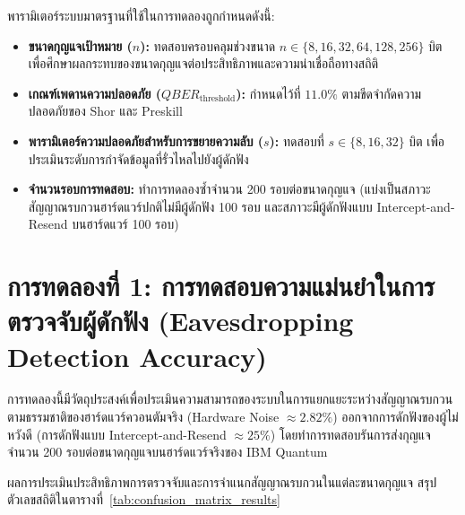 พารามิเตอร์ระบบมาตรฐานที่ใช้ในการทดลองถูกกำหนดดังนี้:
\begin{itemize}
    \item \textbf{ขนาดกุญแจเป้าหมาย ($n$):} ทดสอบครอบคลุมช่วงขนาด $n \in \{8, 16, 32, 64, 128, 256\}$ บิต เพื่อศึกษาผลกระทบของขนาดกุญแจต่อประสิทธิภาพและความน่าเชื่อถือทางสถิติ
    \item \textbf{เกณฑ์เพดานความปลอดภัย ($QBER_{\text{threshold}}$):} กำหนดไว้ที่ $11.0\%$ ตามขีดจำกัดความปลอดภัยของ Shor และ Preskill~\cite{shor_preskill_2000}
    \item \textbf{พารามิเตอร์ความปลอดภัยสำหรับการขยายความลับ ($s$):} ทดสอบที่ $s \in \{8, 16, 32\}$ บิต เพื่อประเมินระดับการกำจัดข้อมูลที่รั่วไหลไปยังผู้ดักฟัง
    \item \textbf{จำนวนรอบการทดสอบ:} ทำการทดลองซ้ำจำนวน 200 รอบต่อขนาดกุญแจ (แบ่งเป็นสภาวะสัญญาณรบกวนฮาร์ดแวร์ปกติไม่มีผู้ดักฟัง 100 รอบ และสภาวะมีผู้ดักฟังแบบ Intercept-and-Resend บนฮาร์ดแวร์ 100 รอบ)
\end{itemize}

\section{การทดลองที่ 1: การทดสอบความแม่นยำในการตรวจจับผู้ดักฟัง (Eavesdropping Detection Accuracy)}

การทดลองนี้มีวัตถุประสงค์เพื่อประเมินความสามารถของระบบในการแยกแยะระหว่างสัญญาณรบกวนตามธรรมชาติของฮาร์ดแวร์ควอนตัมจริง (Hardware Noise $\approx 2.82\%$) ออกจากการดักฟังของผู้ไม่หวังดี (การดักฟังแบบ Intercept-and-Resend $\approx 25\%$) โดยทำการทดสอบรันการส่งกุญแจจำนวน 200 รอบต่อขนาดกุญแจบนฮาร์ดแวร์จริงของ IBM Quantum 

ผลการประเมินประสิทธิภาพการตรวจจับและการจำแนกสัญญาณรบกวนในแต่ละขนาดกุญแจ สรุปตัวเลขสถิติในตารางที่~\ref{tab:confusion_matrix_results}

